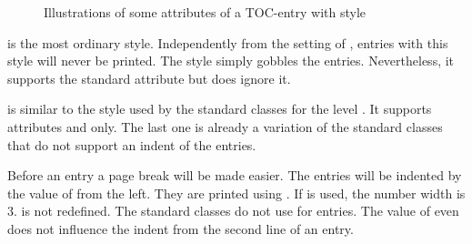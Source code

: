 \begin{description}
\begin{figure}
{%
    }
    \caption{Illustrations of some attributes of a TOC-entry with style 
      }
    \label{fig:tocbasic.dottedtocline}
  \end{figure}
\item[\PValue{gobble}] is the most ordinary style. Independently from the
  setting of %
  ,
  entries with this style will never be printed.  The style simply gobbles the
  entries. Nevertheless, it supports the standard attribute  but
  does ignore it.
\item[\PValue{largetocline}] is similar to the style used by the standard
  classes for the level . It supports attributes 
  and  only. The last one is already a variation of the
  standard classes that do not support an indent of the  entries.

  Before an entry a page break will be made easier. The entries will be
  indented by the value of  from the left. They are printed
  using . If 
  is used, the number width is 3. 
  is not redefined. The standard classes do not use
   for  entries. The value of
   even does not influence the indent from the second line of an
  entry.


\end{description}
